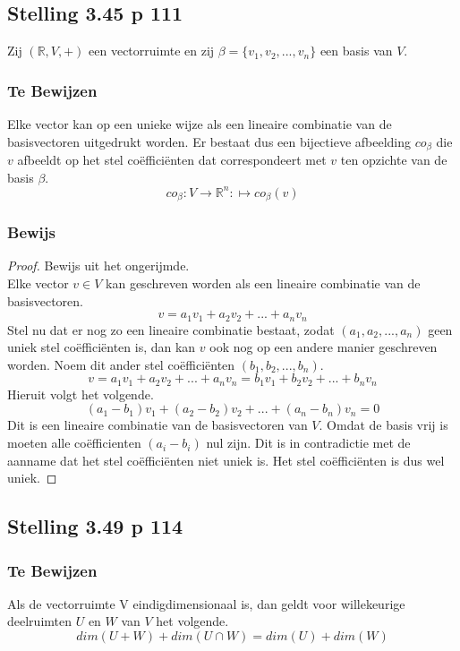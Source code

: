 \documentclass[lineaire_algebra_oplossingen.tex]{subfiles}
\begin{document}
\subsection{Stelling 3.45 p 111}
Zij $(\mathbb{R},V,+)$ een vectorruimte en zij $\beta = \{v_1,v_2,...,v_n\}$ een basis van $V$.
\subsubsection*{Te Bewijzen}
Elke vector kan op een unieke wijze als een lineaire combinatie van de basisvectoren uitgedrukt worden. Er bestaat dus een bijectieve afbeelding $co_{\beta}$ die $v$ afbeeldt op het stel co\"effici\"enten dat correspondeert met $v$ ten opzichte van de basis $\beta$.
\[
co_{\beta}: V \rightarrow \mathbb{R}^n
 : \mapsto co_{\beta}(v)\]
\subsubsection*{Bewijs}
\begin{proof}
Bewijs uit het ongerijmde.\\
Elke vector $v\in V$ kan geschreven worden als een lineaire combinatie van de basisvectoren.
\[
v = a_1v_1 + a_2v_2 + ... + a_nv_n
\]
Stel nu dat er nog zo een lineaire combinatie bestaat, zodat $(a_1,a_2,...,a_n)$ geen uniek stel co\"effici\"enten is, dan kan $v$ ook nog op een andere manier geschreven worden. Noem dit ander stel co\"effici\"enten $(b_1,b_2,...,b_n)$.
\[
v = a_1v_1 + a_2v_2 + ... + a_nv_n = b_1v_1 + b_2v_2 + ... + b_nv_n
\]
Hieruit volgt het volgende.
\[ 
(a_1-b_1)v_1 + (a_2-b_2)v_2 + ... + (a_n-b_n)v_n= 0
\]
Dit is een lineaire combinatie van de basisvectoren van $V$. Omdat de basis vrij is moeten alle co\"efficienten $(a_i-b_i)$ nul zijn. Dit is in contradictie met de aanname dat het stel co\"effici\"enten niet uniek is. Het stel co\"effici\"enten is dus wel uniek.
\end{proof}

\subsection{Stelling 3.49 p 114}
\subsubsection*{Te Bewijzen}
Als de vectorruimte V eindigdimensionaal is, dan geldt voor willekeurige deelruimten $U$ en $W$ van $V$ het volgende.
\[
dim(U+W) + dim(U\cap W) = dim(U) + dim(W)
\]
\end{document}

